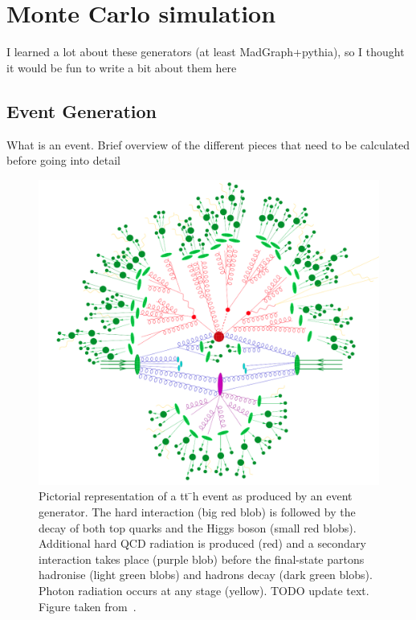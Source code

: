 \chapter[Monte Carlo simulation][Monte Carlo simulation]{Monte Carlo simulation}
\label{ch:mc}

{\color{red} I learned a lot about these generators (at least MadGraph+pythia),
  so I thought it would be fun to write a bit about them here}

\section{Event Generation}

{\color{red} What is an event. Brief overview of the different pieces that need
  to be calculated before going into detail}

\begin{figure}[p]
  \centering
  \includegraphics[width=\textwidth, clip=true, trim=0 0 0 0]
    {figs/mc_gen/full_mc_event.png}
  \caption{Pictorial representation of a tt ̄h event as produced by an event generator. The hard interaction (big red blob) is followed by the decay of both top quarks and the Higgs boson (small red blobs). Additional hard QCD radiation is produced (red) and a secondary interaction takes place (purple blob) before the final-state partons hadronise (light green blobs) and hadrons decay (dark green blobs). Photon radiation occurs at any stage (yellow). {\color{red} TODO update text}.
    Figure taken from~\cite{Gleisberg:2008ta}.
  }
  \label{fig:mc_event}
\end{figure}


